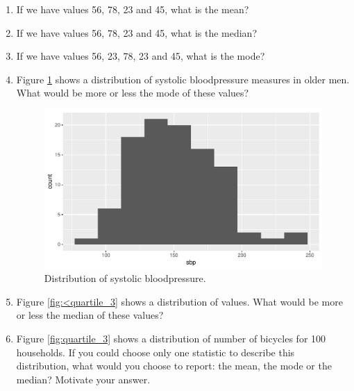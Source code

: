 \documentclass[]{report}\usepackage[]{graphicx}\usepackage[]{color}
\makeatletter
\def\maxwidth{ %
  \ifdim\Gin@nat@width>\linewidth
    \linewidth
  \else
    \Gin@nat@width
  \fi
}
\makeatother
\begin{document}
\begin{enumerate}

\item If we have values 56, 78, 23 and 45, what is the mean?

\item If we have values 56, 78, 23 and 45, what is the median?

\item If we have values 56, 23, 78, 23 and 45, what is the mode?

\item Figure \ref{fig:mode} shows a distribution of systolic bloodpressure measures in older men. What would be more or less the mode of these values?

\begin{figure}

{\centering \includegraphics[width=\maxwidth]{figure/mode-1} 

}

\caption[Distribution of systolic bloodpressure]{Distribution of systolic bloodpressure.}\label{fig:mode}
\end{figure}



\item Figure \ref{fig:<quartile_3} shows a distribution of values. What would be more or less the median of these values?

\item Figure \ref{fig:quartile_3} shows a distribution of number of bicycles for 100 households. If you could choose only one statistic to describe this distribution, what would you choose to report: the mean, the mode or the median? Motivate your answer.

\begin{figure}


\end{figure}
\end{enumerate}
\end{document}
